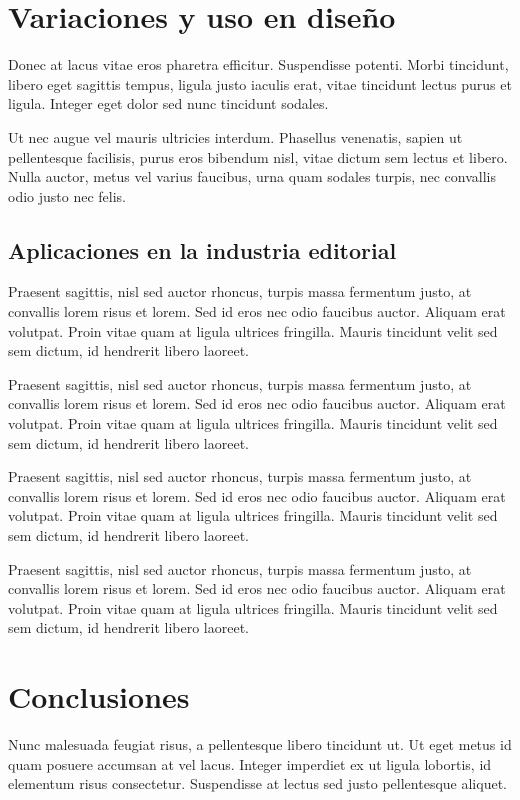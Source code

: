 \section{Variaciones y uso en diseño}

Donec at lacus vitae eros pharetra efficitur. Suspendisse potenti. Morbi tincidunt, libero eget sagittis tempus, ligula justo iaculis erat, vitae tincidunt lectus purus et ligula. Integer eget dolor sed nunc tincidunt sodales.

Ut nec augue vel mauris ultricies interdum. Phasellus venenatis, sapien ut pellentesque facilisis, purus eros bibendum nisl, vitae dictum sem lectus et libero. Nulla auctor, metus vel varius faucibus, urna quam sodales turpis, nec convallis odio justo nec felis.

\subsection{Aplicaciones en la industria editorial}

Praesent sagittis, nisl sed auctor rhoncus, turpis massa fermentum justo, at convallis lorem risus et lorem. Sed id eros nec odio faucibus auctor. Aliquam erat volutpat. Proin vitae quam at ligula ultrices fringilla. Mauris tincidunt velit sed sem dictum, id hendrerit libero laoreet.

Praesent sagittis, nisl sed auctor rhoncus, turpis massa fermentum justo, at convallis lorem risus et lorem. Sed id eros nec odio faucibus auctor. Aliquam erat volutpat. Proin vitae quam at ligula ultrices fringilla. Mauris tincidunt velit sed sem dictum, id hendrerit libero laoreet.

Praesent sagittis, nisl sed auctor rhoncus, turpis massa fermentum justo, at convallis lorem risus et lorem. Sed id eros nec odio faucibus auctor. Aliquam erat volutpat. Proin vitae quam at ligula ultrices fringilla. Mauris tincidunt velit sed sem dictum, id hendrerit libero laoreet.

Praesent sagittis, nisl sed auctor rhoncus, turpis massa fermentum justo, at convallis lorem risus et lorem. Sed id eros nec odio faucibus auctor. Aliquam erat volutpat. Proin vitae quam at ligula ultrices fringilla. Mauris tincidunt velit sed sem dictum, id hendrerit libero laoreet.

\section{Conclusiones}

Nunc malesuada feugiat risus, a pellentesque libero tincidunt ut. Ut eget metus id quam posuere accumsan at vel lacus. Integer imperdiet ex ut ligula lobortis, id elementum risus consectetur. Suspendisse at lectus sed justo pellentesque aliquet.

